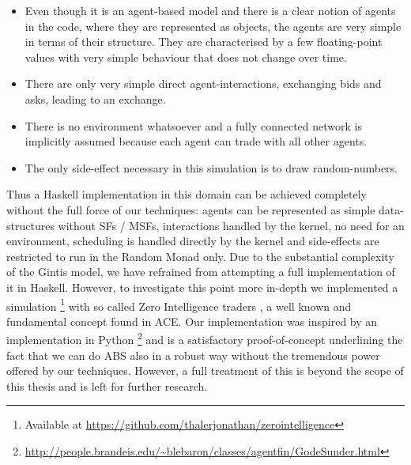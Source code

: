 \begin{itemize}
	\item Even though it is an agent-based model and there is a clear notion of agents in the code, where they are represented as objects, the agents are very simple in terms of their structure. They are characterised by a few floating-point values with very simple behaviour that does not change over time.

	\item There are only very simple direct agent-interactions, exchanging bids and asks, leading to an exchange.

	\item There is no environment whatsoever and a fully connected network is implicitly assumed because each agent can trade with all other agents.
	
	\item The only side-effect necessary in this simulation is to draw random-numbers.
\end{itemize}

Thus a Haskell implementation in this domain can be achieved completely without the full force of our techniques: agents can be represented as simple data-structures without SFs / MSFs, interactions handled by the kernel, no need for an environment, scheduling is handled directly by the kernel and side-effects are restricted to run in the Random Monad only. Due to the substantial complexity of the Gintis model, we have refrained from attempting a full implementation of it in Haskell. However, to investigate this point more in-depth we implemented a simulation \footnote{Available at \url{https://github.com/thalerjonathan/zerointelligence}} with so called Zero Intelligence traders \cite{gode_allocative_1993}, a well known and fundamental concept found in ACE. Our implementation was inspired by an implementation in Python \footnote{\url{http://people.brandeis.edu/~blebaron/classes/agentfin/GodeSunder.html}} and is a satisfactory proof-of-concept underlining the fact that we can do ABS also in a robust way without the tremendous power offered by our techniques. However, a full treatment of this is beyond the scope of this thesis and is left for further research.

